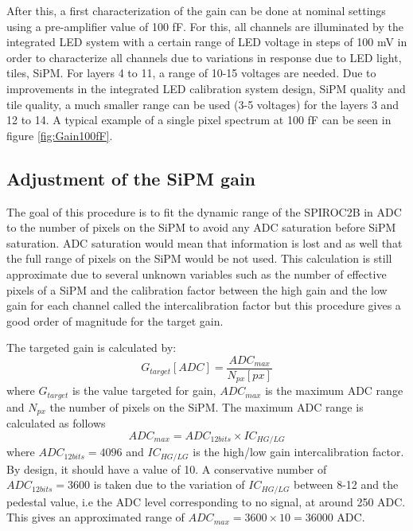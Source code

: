 After this, a first characterization of the gain can be done at nominal settings using a pre-amplifier value of 100 fF. For this, all channels are illuminated by the integrated LED system with a certain range of LED voltage in steps of 100 mV in order to characterize all channels due to variations in response due to LED light, tiles, SiPM. For layers 4 to 11, a range of 10-15 voltages are needed. Due to improvements in the integrated LED calibration system design, SiPM quality and tile quality, a much smaller range can be used (3-5 voltages) for the layers 3 and 12 to 14. A typical example of a single pixel spectrum at 100 fF can be seen in figure \ref{fig:Gain100fF}.

\subsection{Adjustment of the SiPM gain}
\label{sec:AdjustGain}

The goal of this procedure is to fit the dynamic range of the SPIROC2B in ADC to the number of pixels on the SiPM to avoid any ADC saturation before SiPM saturation. ADC saturation would mean that information is lost and as well that the full range of pixels on the SiPM would be not used. This calculation is still approximate due to several unknown variables such as the number of effective pixels of a SiPM and the calibration factor between the high gain and the low gain for each channel called the intercalibration factor but this procedure gives a good order of magnitude for the target gain.

The targeted gain is calculated by:
\begin{equation}
  G_{target} [ADC] = \frac{ADC_{max}}{N_{px} [px]}
\end{equation}
where $G_{target}$ is the value targeted for gain, $ADC_{max}$ is the maximum ADC range and $N_{px}$ the number of pixels on the SiPM. The maximum ADC range is calculated as follows
\begin{equation}
  ADC_{max} = ADC_{12 bits} \times IC_{HG/LG}
\end{equation}
where $ADC_{12 bits} = 4096$ and $IC_{HG/LG}$ is the high/low gain intercalibration factor. By design, it should have a value of 10. A conservative number of $ADC_{12 bits} = 3600$ is taken due to the variation of $IC_{HG/LG}$ between 8-12 and the pedestal value, i.e the ADC level corresponding to no signal, at around 250 ADC. This gives an approximated range of $ADC_{max} = 3600 \times 10 = 36 000$ ADC.

